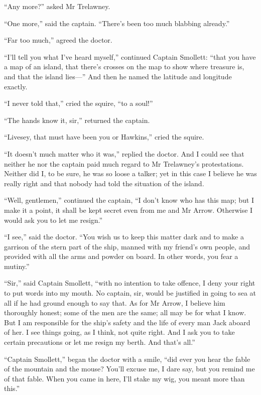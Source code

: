 \enquote{Any more?} asked Mr Trelawney.

\enquote{One more,} said the captain. \enquote{There’s been too much blabbing already.}

\enquote{Far too much,} agreed the doctor.

\enquote{I’ll tell you what I’ve heard myself,} continued Captain Smollett: \enquote{that you have a map of an island, that there’s crosses on the map to show where treasure is, and that the island lies---} And then he named the latitude and longitude exactly.

\enquote{I never told that,} cried the squire, \enquote{to a soul!}

\enquote{The hands know it, sir,} returned the captain.

\enquote{Livesey, that must have been you or Hawkins,} cried the squire.

\enquote{It doesn’t much matter who it was,} replied the doctor. And I could see that neither he nor the captain paid much regard to Mr Trelawney’s protestations. Neither did I, to be sure, he was so loose a talker; yet in this case I believe he was really right and that nobody had told the situation of the island.

\enquote{Well, gentlemen,} continued the captain, \enquote{I don’t know who has this map; but I make it a point, it shall be kept secret even from me and Mr Arrow. Otherwise I would ask you to let me resign.}

\enquote{I see,} said the doctor. \enquote{You wish us to keep this matter dark and to make a garrison of the stern part of the ship, manned with my friend’s own people, and provided with all the arms and powder on board. In other words, you fear a mutiny.}

\enquote{Sir,} said Captain Smollett, \enquote{with no intention to take offence, I deny your right to put words into my mouth. No captain, sir, would be justified in going to sea at all if he had ground enough to say that. As for Mr Arrow, I believe him thoroughly honest; some of the men are the same; all may be for what I know. But I am responsible for the ship’s safety and the life of every man Jack aboard of her. I see things going, as I think, not quite right. And I ask you to take certain precautions or let me resign my berth. And that’s all.}

\enquote{Captain Smollett,} began the doctor with a smile, \enquote{did ever you hear the fable of the mountain and the mouse? You’ll excuse me, I dare say, but you remind me of that fable. When you came in here, I’ll stake my wig, you meant more than this.}

